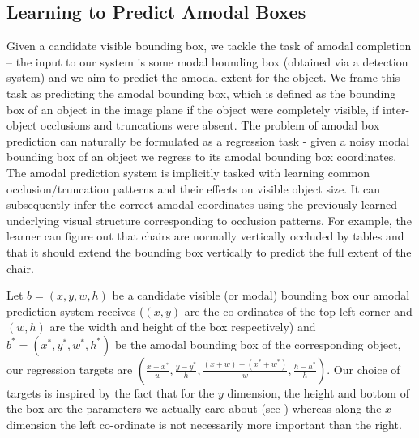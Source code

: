 \subsection{Learning to Predict Amodal Boxes}
Given a candidate visible bounding box, we tackle the task of amodal completion -- the input to our system is some modal bounding box (\eg obtained via a detection system) and we aim to predict the amodal extent for the object. We frame this task as predicting the amodal bounding box, which is defined as  the bounding box of an object in the image plane if the object were completely visible, \ie if inter-object occlusions and truncations were absent. The problem of amodal box prediction can naturally be formulated as a regression task - given a noisy modal bounding box of an object we regress to its amodal bounding box coordinates. The amodal prediction system is implicitly tasked with learning common occlusion/truncation patterns and their effects on visible object size. It can subsequently infer the correct amodal coordinates using the previously learned underlying visual structure corresponding to occlusion patterns. For example, the learner can figure out that chairs are normally vertically occluded by tables and that it should extend the bounding box vertically to predict the full extent of the chair.

Let $b = (x,y,w,h)$ be a candidate visible (or modal) bounding box our amodal prediction system receives ($(x,y)$ are the co-ordinates of the top-left corner and $(w,h)$ are the width and height of the box respectively) and $b^* = (x^*,y^*,w^*,h^*)$ be the amodal bounding box of the corresponding object, our regression targets are $(\frac{x-x^*}{w},\frac{y-y^*}{h},\frac{(x+w)-(x^*+w^*)}{w},\frac{h-h^*}{h})$. Our choice of targets is inspired by the fact that for the $y$ dimension, the height and bottom of the box are the parameters we actually care about (see ) whereas along the $x$ dimension the left co-ordinate is not necessarily more important than the right.

